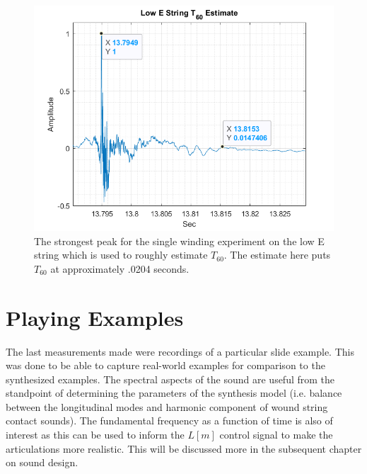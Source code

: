 \documentclass[../main.tex]{subfiles}
\begin{document}
\begin{figure}[h!]
    \centering
    \includegraphics[scale=.65]{./images/plots/T60Attempt.png}
    \caption{The strongest peak for the single winding experiment on the low E string which is used to roughly estimate $T_{60}$. The estimate here puts $T_{60}$ at approximately .0204 seconds.}
    \label{fig:T60Measurement}
\end{figure}

\clearpage

\section{Playing Examples}
 The last measurements made were recordings of a particular slide example. This was done to be able to capture real-world examples for comparison to the synthesized examples. The spectral aspects of the sound are useful from the standpoint of determining the parameters of the synthesis model (i.e. balance between the longitudinal modes and harmonic component of wound string contact sounds). The fundamental frequency as a function of time is also of interest as this can be used to inform the $L[m]$ control signal to make the articulations more realistic. This will be discussed more in the subsequent chapter on sound design.
\end{document}
